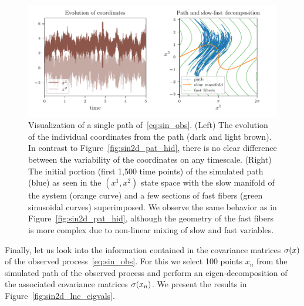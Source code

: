 \documentclass{article}
\begin{document}
\begin{figure}
    \centering
    \includegraphics[draft=false,width=\textwidth]{figs/sin2d_paths_observed.pdf}
    \caption{Visualization of a single path of~\eqref{eq:sin_obs}. (Left) The evolution of the individual coordinates from the path (dark and light brown). In contrast to Figure~\ref{fig:sin2d_pat_hid}, there is no clear difference between the variability of the coordinates on any timescale. (Right) The initial portion (first 1,500 time points) of the simulated path (blue) as seen in the $(x^1,x^2)$ state space with the slow manifold of the system (orange curve) and a few sections of fast fibers (green sinusoidal curves) superimposed. We observe the same behavior as in Figure~\ref{fig:sin2d_pat_hid}, although the geometry of the fast fibers is more complex due to non-linear mixing of slow and fast variables.}
    \label{fig:sin2d_pat_obs}
\end{figure}

Finally, let us look into the information contained in the covariance matrices $\sigma(x)$ of the observed process~\eqref{eq:sin_obs}. For this we select 100 points $x_n$ from the simulated path of the observed process and perform an eigen-decomposition of the associated covariance matrices $\sigma(x_n)$. We present the results in Figure~\ref{fig:sin2d_lnc_eigvals}.
\end{document}
